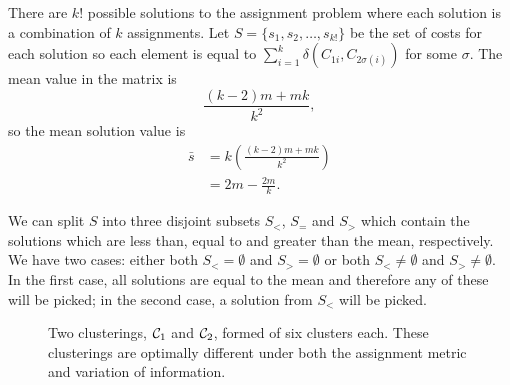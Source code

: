 There are $k!$ possible solutions to the assignment problem where each
solution is a combination of $k$ assignments.  Let $S = \{s_1, s_2, \dotsc,
s_{k!}\}$ be the set of costs for each solution so each element is equal to
$\sum_{i=1}^{k} \delta(C_{1i}, C_{2\sigma(i)})$ for some $\sigma$.  The mean
value in the matrix is
\begin{equation*}
  \frac{(k-2)m + mk}{k^2},
\end{equation*}
so the mean solution value is
\begin{align*}
  \bar{s} &= k \left( \frac{(k-2)m + mk}{k^2} \right)\\
          &= 2m - \frac{2m}{k}.
\end{align*}

We can split $S$ into three disjoint subsets $S_{<}$, $S_{=}$ and $S_{>}$
which contain the solutions which are less than, equal to and greater than the
mean, respectively.  We have two cases: either both $S_{<} = \emptyset$ and
$S_{>} = \emptyset$ or both $S_{<} \neq \emptyset$ and $S_{>} \neq \emptyset$.
In the first case, all solutions are equal to the mean and therefore any of
these will be picked; in the second case, a solution from $S_{<}$ will be
picked.

\begin{figure}
  \centering
  \caption{Two clusterings, $\mathcal{C}_1$ and $\mathcal{C}_2$, formed of six
    clusters each.  These clusterings are optimally different under both the
    assignment metric and variation of information.}
  \label{fig:worst-case}
\end{figure}

